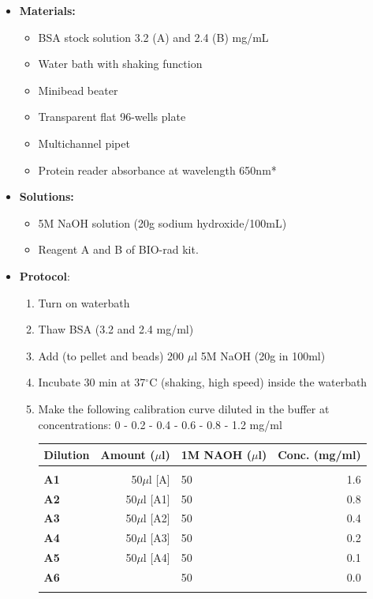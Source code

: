 \documentclass{EU-report}
\begin{document}
\begin{itemize}
\item \textbf{Materials:}
\begin{itemize} 
\item BSA stock solution 3.2 (A) and 2.4 (B) mg/mL
\item Water bath with shaking function
\item Minibead beater
\item Transparent flat 96-wells plate
\item Multichannel pipet
\item Protein reader absorbance at wavelength 650nm*
\end{itemize}
\item \textbf{Solutions:}
\begin{itemize}
\item 5M NaOH solution (20g sodium hydroxide/100mL)
\item Reagent A and B of BIO-rad kit.
\end{itemize}
\item\textbf{Protocol}:
\begin{enumerate}
\item Turn on waterbath 
\item Thaw BSA (3.2 and 2.4 mg/ml)
\item Add (to pellet and beads) 200 $\mu$l 5M NaOH (20g in 100ml)
\item Incubate 30 min at 37$^{\circ}$C (shaking, high speed) inside the waterbath
\item Make the following calibration curve diluted in the buffer at concentrations: 0 - 0.2 - 0.4 - 0.6 - 0.8 - 1.2 mg/ml
\begin{center}
	\begin{tabular}{lrp{7cm}r} \hline\hline
\textbf{Dilution} & \textbf{Amount ($\mu$l)} 	 & \textbf{ 1M NAOH ($\mu$l)} & \textbf{ Conc. (mg/ml)} \\
\hline
 \textbf{}	               &                                                               & 					                        & \\
 \hline
 \textbf{A1}	 	& 50$\mu$l [A]	                                        & 50							& 1.6\\
 \hline
 \textbf{A2}	 	& 50$\mu$l [A1]			              & 50						        & 0.8\\
 \hline
 \textbf{A3}	 	& 50$\mu$l [A2]			 	      & 50						       & 0.4\\
 \hline
 \textbf{A4}	       &  50$\mu$l [A3]			   	              & 50						       & 0.2\\
 \hline
 \textbf{A5}	       & 50$\mu$l [A4]	                                       & 50					               & 0.1\\
 \hline
 \textbf{A6}	       &                                                               & 50					               & 0.0\\
 \hline
 \textbf{}	               &                                                               & 					                        & \\
 \hline


\end{tabular}
\end{center}
\end{enumerate}
\end{itemize}
\end{document}
